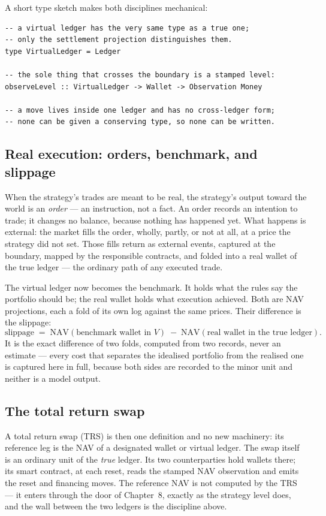 \documentclass[11pt,a4paper]{article}
\begin{document}
A short type sketch makes both disciplines mechanical:

\begin{lstlisting}
-- a virtual ledger has the very same type as a true one;
-- only the settlement projection distinguishes them.
type VirtualLedger = Ledger

-- the sole thing that crosses the boundary is a stamped level:
observeLevel :: VirtualLedger -> Wallet -> Observation Money

-- a move lives inside one ledger and has no cross-ledger form;
-- none can be given a conserving type, so none can be written.
\end{lstlisting}

\subsection{Real execution: orders, benchmark, and slippage}

When the strategy's trades are meant to be real, the strategy's output toward the
world is an \emph{order} --- an instruction, not a fact. An order records an
intention to trade; it changes no balance, because nothing has happened yet. What
happens is external: the market fills the order, wholly, partly, or not at all,
at a price the strategy did not set. Those fills return as external events,
captured at the boundary, mapped by the responsible contracts, and folded into a
real wallet of the true ledger --- the ordinary path of any executed trade.

The virtual ledger now becomes the benchmark. It holds what the rules say the
portfolio should be; the real wallet holds what execution achieved. Both are NAV
projections, each a fold of its own log against the same prices. Their difference
is the slippage:
\[
  \text{slippage} \;=\; \mathrm{NAV}(\text{benchmark wallet in } V) \;-\;
                        \mathrm{NAV}(\text{real wallet in the true ledger}).
\]
It is the exact difference of two folds, computed from two records, never an
estimate --- every cost that separates the idealised portfolio from the realised
one is captured here in full, because both sides are recorded to the minor unit
and neither is a model output.

\subsection{The total return swap}

A total return swap (TRS) is then one definition and no new machinery: its
reference leg is the NAV of a designated wallet or virtual ledger. The swap
itself is an ordinary unit of the \emph{true} ledger. Its two counterparties hold
wallets there; its smart contract, at each reset, reads the stamped NAV
observation and emits the reset and financing moves. The reference NAV is not
computed by the TRS --- it enters through the door of Chapter~8, exactly as the
strategy level does, and the wall between the two ledgers is the discipline above.
\end{document}
